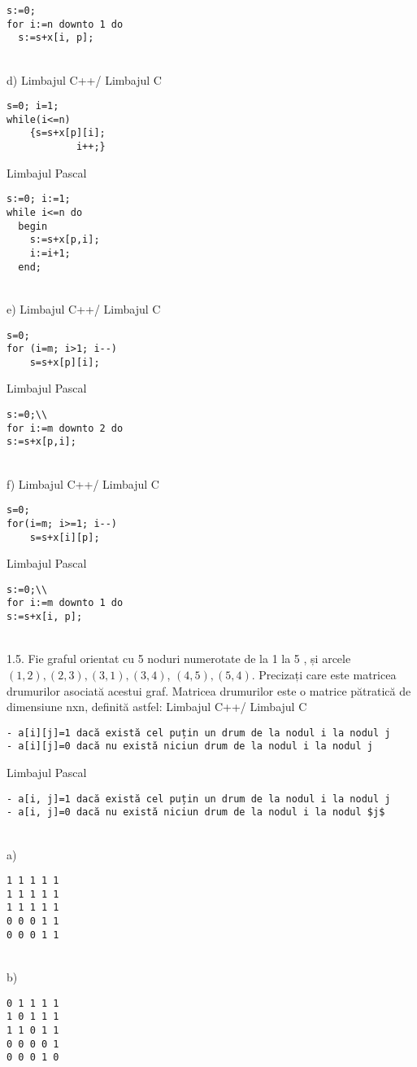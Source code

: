 \begin{verbatim}
s:=0;
for i:=n downto 1 do
  s:=s+x[i, p];
\end{verbatim}
\\
d) Limbajul C++/ Limbajul C
\begin{verbatim}
s=0; i=1;
while(i<=n)
    {s=s+x[p][i];
            i++;}
\end{verbatim}
Limbajul Pascal
\begin{verbatim}
s:=0; i:=1;
while i<=n do
  begin
    s:=s+x[p,i];
    i:=i+1;
  end;
\end{verbatim}
\\
e) Limbajul C++/ Limbajul C
\begin{verbatim}
s=0;
for (i=m; i>1; i--)
    s=s+x[p][i];
\end{verbatim}
Limbajul Pascal
\begin{verbatim}
s:=0;\\
for i:=m downto 2 do
s:=s+x[p,i];
\end{verbatim}
\\
f) Limbajul C++/ Limbajul C
\begin{verbatim}
s=0;
for(i=m; i>=1; i--)
    s=s+x[i][p];
\end{verbatim}
Limbajul Pascal
\begin{verbatim}
s:=0;\\
for i:=m downto 1 do
s:=s+x[i, p];
\end{verbatim}
\\
1.5. Fie graful orientat cu 5 noduri numerotate de la 1 la 5 , și arcele $(1,2),(2,3),(3,1),(3,4)$, $(4,5),(5,4)$. Precizați care este matricea drumurilor asociată acestui graf. Matricea drumurilor este o matrice pătratică de dimensiune nxn, definită astfel:
Limbajul C++/ Limbajul C
\begin{verbatim}
- a[i][j]=1 dacă există cel puțin un drum de la nodul i la nodul j
- a[i][j]=0 dacă nu există niciun drum de la nodul i la nodul j
\end{verbatim}
Limbajul Pascal
\begin{verbatim}
- a[i, j]=1 dacă există cel puțin un drum de la nodul i la nodul j
- a[i, j]=0 dacă nu există niciun drum de la nodul i la nodul $j$
\end{verbatim}
\\
a) \begin{verbatim}
1 1 1 1 1
1 1 1 1 1
1 1 1 1 1
0 0 0 1 1
0 0 0 1 1
\end{verbatim}
\\
b) \begin{verbatim}
0 1 1 1 1
1 0 1 1 1
1 1 0 1 1
0 0 0 0 1
0 0 0 1 0
\end{verbatim}
